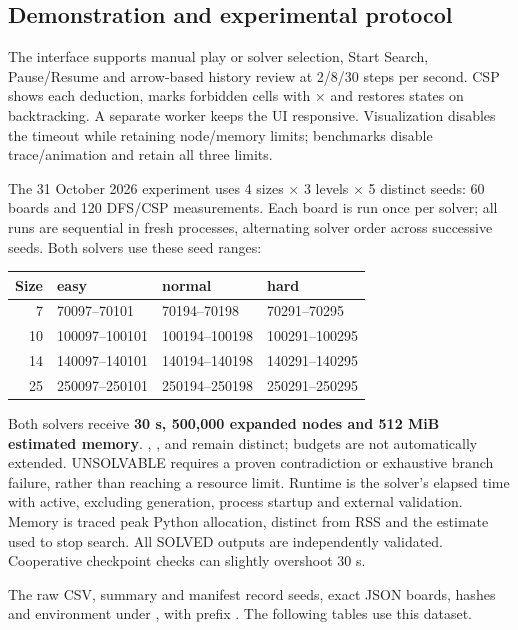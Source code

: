 \subsection{Demonstration and experimental protocol}
The interface supports manual play or solver selection, Start Search,
Pause/Resume and arrow-based history review at 2/8/30 steps per second. CSP
shows each deduction, marks forbidden cells with $\times$ and restores states
on backtracking. A separate worker keeps the UI responsive. Visualization
disables the timeout while retaining node/memory limits; benchmarks disable
trace/animation and retain all three limits.

The 31 October 2026 experiment uses 4 sizes $\times$ 3 levels $\times$ 5 distinct
seeds: 60 boards and 120 DFS/CSP measurements. Each board is run once per solver;
all runs are sequential in fresh processes, alternating solver order across
successive seeds. Both solvers use these seed ranges:
\begin{center}\small
\begin{tabular}{@{}rlll@{}}\toprule
Size & easy & normal & hard\\\midrule
7 & 70097--70101 & 70194--70198 & 70291--70295\\
10 & 100097--100101 & 100194--100198 & 100291--100295\\
14 & 140097--140101 & 140194--140198 & 140291--140295\\
25 & 250097--250101 & 250194--250198 & 250291--250295\\
\bottomrule\end{tabular}
\end{center}

Both solvers receive \textbf{30 s, 500,000 expanded nodes and 512 MiB estimated
memory}. , ,  and
 remain distinct; budgets are not automatically extended.
UNSOLVABLE requires a proven contradiction or exhaustive branch failure,
rather than reaching a resource limit.
Runtime is the solver's  elapsed time with 
active, excluding generation, process startup and external validation. Memory
is traced peak Python allocation, distinct from RSS and the estimate used to
stop search. All SOLVED outputs are independently validated. Cooperative
checkpoint checks can slightly overshoot 30 s.

The raw CSV, summary and manifest record seeds, exact JSON boards, hashes and
environment under , with prefix
. The following tables use this dataset.

